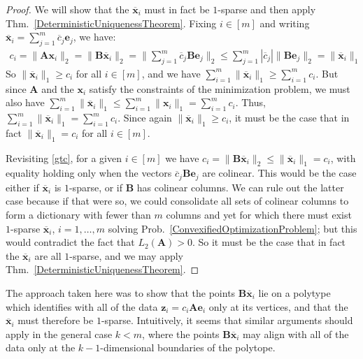 \begin{proof}
We will show that the $\mathbf{\overline x}_i$ must in fact be $1$-sparse and then apply Thm.~\ref{DeterministicUniquenessTheorem}. Fixing $i \in [m]$ and writing $\mathbf{\overline x}_i = \sum_{j=1}^m \overline c_{j} \mathbf{e}_j$, we have:
\begin{align}\label{gtc}
c_i = \|\mathbf{Ax}_i\|_2 = \|\mathbf{B \overline x}_i\|_2 = \|\sum_{j=1}^m \overline c_{j} \mathbf{Be}_j\|_2 \leq \sum_{j=1}^m |\overline c_{j}| \|\mathbf{Be}_j\|_2 = \|\mathbf{\overline x}_i\|_1
\end{align}
So $\|\mathbf{\overline x}_i\|_1 \geq c_i$ for all $i \in [m]$, and we have $\sum_{i=1}^m \|\mathbf{\overline x}_i\|_1 \geq \sum_{i=1}^m  c_i$. But since $\mathbf{A}$ and the $\mathbf{x}_i$ satisfy the constraints of the minimization problem, we must also have $\sum_{i=1}^m \|\mathbf{\overline x}_i\|_1 \leq \sum_{i=1}^m \|\mathbf{x}_i\|_1 = \sum_{i=1}^m  c_i$. Thus, $\sum_{i=1}^m \|\mathbf{\overline x}_i\|_1 = \sum_{i=1}^m  c_i$. Since again $\|\mathbf{\overline x}_i\|_1 \geq c_i$, it must be the case that in fact $\| \mathbf{\overline x}_i\|_1 = c_i$ for all $i \in [m]$.

Revisiting \eqref{gtc}, for a given $i \in [m]$ we have $c_i = \|\mathbf{B\overline x}_i\|_2 \leq \|\mathbf{\overline x}_i\|_1 = c_i$, with equality holding only when the vectors $\overline c_j \mathbf{Be}_j$ are colinear. This would be the case either if $\mathbf{\overline x}_i$ is $1$-sparse, or if $\mathbf{B}$ has colinear columns. We can rule out the latter case because if that were so, we could consolidate all sets of colinear columns to form a dictionary with fewer than $m$ columns and yet for which there must exist $1$-sparse $\mathbf{\overline x}_i$, $i = 1, \ldots, m$ solving Prob.~\ref{ConvexifiedOptimizationProblem}; but this would contradict the fact that $L_2(\mathbf{A}) > 0$. So it must be the case that in fact the $\mathbf{\overline x}_i$ are all $1$-sparse, and we may apply Thm.~\ref{DeterministicUniquenessTheorem}.
\end{proof}

The approach taken here was to show that the points $\mathbf{B \overline x}_i$ lie on a polytype which identifies with all of the data $\mathbf{z}_i = c_i\mathbf{Ae}_i$ only at its vertices, and that the $\mathbf{\overline x}_i$ must therefore be $1$-sparse. Intuitively, it seems that similar arguments should apply in the general case $k < m$, where the points $\mathbf{B \overline x}_i$ may align with all of the data only at the $k-1$-dimensional boundaries of the polytope. 

